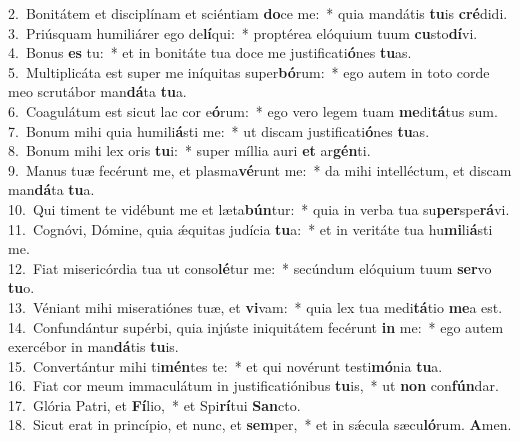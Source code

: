 {2.~}Bonitátem et disciplínam et sciéntiam \textbf{do}ce me:~* quia mandátis \textbf{tu}is \textbf{cré}didi.\\
{3.~}Priúsquam humiliárer ego de\textbf{lí}qui:~* proptérea elóquium tuum \textbf{cu}sto\textbf{dí}vi.\\
{4.~}Bonus \textbf{es} tu:~* et in bonitáte tua doce me justificati\textbf{ó}nes \textbf{tu}as.\\
{5.~}Multiplicáta est super me iníquitas super\textbf{bó}rum:~* ego autem in toto corde meo scrutábor man\textbf{dá}ta \textbf{tu}a.\\
{6.~}Coagulátum est sicut lac cor e\textbf{ó}rum:~* ego vero legem tuam \textbf{me}di\textbf{tá}tus sum.\\
{7.~}Bonum mihi quia humili\textbf{á}sti me:~* ut discam justificati\textbf{ó}nes \textbf{tu}as.\\
{8.~}Bonum mihi lex oris \textbf{tu}i:~* super míllia auri \textbf{et} ar\textbf{gén}ti.\\
{9.~}Manus tuæ fecérunt me, et plasma\textbf{vé}runt me:~* da mihi intelléctum, et discam man\textbf{dá}ta \textbf{tu}a.\\
{10.~}Qui timent te vidébunt me et læta\textbf{bún}tur:~* quia in verba tua su\textbf{per}spe\textbf{rá}vi.\\
{11.~}Cognóvi, Dómine, quia ǽquitas judícia \textbf{tu}a:~* et in veritáte tua hu\textbf{mi}li\textbf{á}sti me.\\
{12.~}Fiat misericórdia tua ut conso\textbf{lé}tur me:~* secúndum elóquium tuum \textbf{ser}vo \textbf{tu}o.\\
{13.~}Véniant mihi miseratiónes tuæ, et \textbf{vi}vam:~* quia lex tua medi\textbf{tá}tio \textbf{me}a est.\\
{14.~}Confundántur supérbi, quia injúste iniquitátem fecérunt \textbf{in} me:~* ego autem exercébor in man\textbf{dá}tis \textbf{tu}is.\\
{15.~}Convertántur mihi ti\textbf{mén}tes te:~* et qui novérunt testi\textbf{mó}nia \textbf{tu}a.\\
{16.~}Fiat cor meum immaculátum in justificatiónibus \textbf{tu}is,~* ut \textbf{non} con\textbf{fún}dar.\\
{17.~}Glória Patri, et \textbf{Fí}lio,~* et Spi\textbf{rí}tui \textbf{San}cto.\\
{18.~}Sicut erat in princípio, et nunc, et \textbf{sem}per,~* et in sǽcula sæcu\textbf{ló}rum. \textbf{A}men.\\
